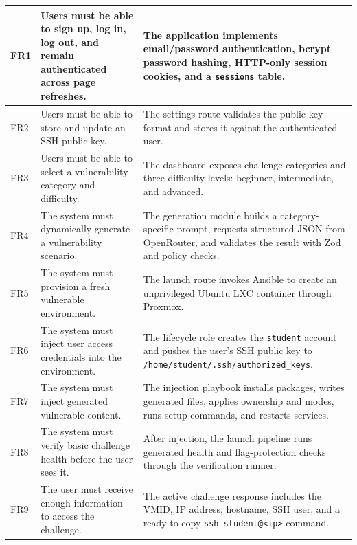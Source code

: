 \begin{longtable}{|p{}|p{}|p{}|}
	FR1         & Users must be able to sign up, log in, log out, and remain authenticated across page refreshes. & The application implements email/password authentication, bcrypt password hashing, HTTP-only session cookies, and a \lstinline|sessions| table.             \\
	\hline
	FR2         & Users must be able to store and update an SSH public key.                                       & The settings route validates the public key format and stores it against the authenticated user.                                                            \\
	\hline
	FR3         & Users must be able to select a vulnerability category and difficulty.                           & The dashboard exposes challenge categories and three difficulty levels: beginner, intermediate, and advanced.                                               \\
	\hline
	FR4         & The system must dynamically generate a vulnerability scenario.                                  & The generation module builds a category-specific prompt, requests structured JSON from OpenRouter, and validates the result with Zod and policy checks.     \\
	\hline
	FR5         & The system must provision a fresh vulnerable environment.                                       & The launch route invokes Ansible to create an unprivileged Ubuntu LXC container through Proxmox.                                                            \\
	\hline
	FR6         & The system must inject user access credentials into the environment.                            & The lifecycle role creates the \lstinline|student| account and pushes the user's SSH public key to \lstinline|/home/student/.ssh/authorized_keys|.          \\
	\hline
	FR7         & The system must inject generated vulnerable content.                                            & The injection playbook installs packages, writes generated files, applies ownership and modes, runs setup commands, and restarts services.                  \\
	\hline
	FR8         & The system must verify basic challenge health before the user sees it.                          & After injection, the launch pipeline runs generated health and flag-protection checks through the verification runner.                                      \\
	\hline
	FR9         & The user must receive enough information to access the challenge.                               & The active challenge response includes the VMID, IP address, hostname, SSH user, and a ready-to-copy \lstinline|ssh student@<ip>| command.                  \\

\end{longtable}
